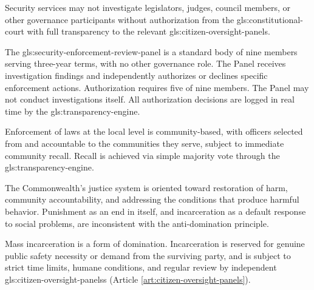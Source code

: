Security services may not investigate legislators, judges, council members, or other governance participants without authorization from the \gls{gls:constitutional-court} with full transparency to the relevant \gls{gls:citizen-oversight-panels}. 

The \gls{gls:security-enforcement-review-panel} is a standard body of nine members serving three-year terms, with no other governance role. The Panel receives investigation findings and independently authorizes or declines specific enforcement actions. Authorization requires five of nine members. The Panel may not conduct investigations itself. All authorization decisions are logged in real time by the \gls{gls:transparency-engine}. 

Enforcement of laws at the local level is community-based, with officers selected from and accountable to the communities they serve, subject to immediate community recall. Recall is achieved via simple majority vote through the \gls{gls:transparency-engine}.


The Commonwealth's justice system is oriented toward restoration of harm, community accountability, and addressing the conditions that produce harmful behavior. Punishment as an end in itself, and incarceration as a default response to social problems, are inconsistent with the anti-domination principle.

Mass incarceration is a form of domination. Incarceration is reserved for genuine public safety necessity or demand from the surviving party, and is subject to strict time limits, humane conditions, and regular review by independent \gls{gls:citizen-oversight-panels}s (Article \ref{art:citizen-oversight-panels}).

